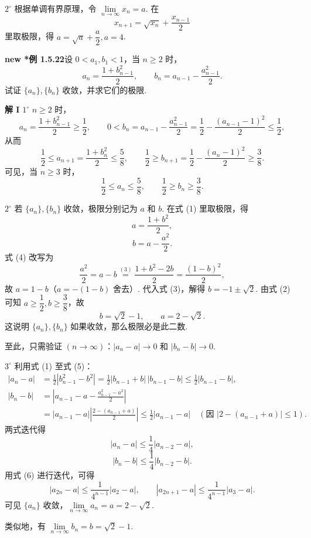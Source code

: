\documentclass[UTF8, 12pt, fontset=fandol, oneside]{ctexart}
\begin{document}
$2^\circ$ 根据单调有界原理，令 $\lim\limits_{n\to\infty}x_n=a$. 在
\[
  x_{n+1}=\sqrt{x_n}+\frac{x_{n-1}}2
\]
里取极限，得 $a=\sqrt a+\dfrac a2,a=4$.

\noindent\textbf{new *例 1.5.22}\quad 设 $0<a_1,b_1<1$，当 $n\ge 2$ 时，
\[
  a_n=\frac{1+b_{n-1}^2}{2},\qquad
  b_n=a_{n-1}-\frac{a_{n-1}^2}{2}.
\tag{1}
\]
试证 $\{a_n\},\{b_n\}$ 收敛，并求它们的极限.

\noindent\textbf{解 I}\quad
$1^\circ$ $n\ge 2$ 时，
\[
  a_n=\frac{1+b_{n-1}^2}{2}\ge \frac12,\qquad
  0<b_n=a_{n-1}-\frac{a_{n-1}^2}{2}
  =\frac12-\frac{(a_{n-1}-1)^2}{2}\le \frac12,
\]
从而
\[
  \frac12\le a_{n+1}=\frac{1+b_n^2}{2}\le \frac58,\qquad
  \frac12\ge b_{n+1}=\frac12-\frac{(a_n-1)^2}{2}\ge \frac38.
\]
可见，当 $n\ge 3$ 时，
\[
  \frac12\le a_n\le \frac58,\qquad \frac12\ge b_n\ge \frac38.
\tag{2}
\]

$2^\circ$ 若 $\{a_n\},\{b_n\}$ 收敛，极限分别记为 $a$ 和 $b$. 在式 (1) 里取极限，得
\[
  a=\frac{1+b^2}{2},
\tag{3}
\]
\[
  b=a-\frac{a^2}{2}.
\tag{4}
\]
式 (4) 改写为
\[
  \frac{a^2}{2}=a-b\stackrel{(3)}{=}
  \frac{1+b^2-2b}{2}
  =\frac{(1-b)^2}{2},
\]
故 $a=1-b$（$a=-(1-b)$ 舍去）. 代入式 (3)，解得 $b=-1\pm\sqrt2$. 由式 (2) 可知 $a\ge \dfrac12,b\ge \dfrac38$，故
\[
  b=\sqrt2-1,\qquad a=2-\sqrt2.
\tag{5}
\]
这说明 $\{a_n\},\{b_n\}$ 如果收敛，那么极限必是此二数.

至此，只需验证 $(n\to\infty)$：$|a_n-a|\to 0$ 和 $|b_n-b|\to 0$.

$3^\circ$ 利用式 (1) 至式 (5)：
\[
\begin{aligned}
  |a_n-a|
  &=\frac12|b_{n-1}^2-b^2|
   =\frac12|b_{n-1}+b|\,|b_{n-1}-b|
   \le \frac12|b_{n-1}-b|,\\
  |b_n-b|
  &=\left|a_{n-1}-a-\frac{a_{n-1}^2-a^2}{2}\right|\\
  &=|a_{n-1}-a|
    \left|\frac{2-(a_{n-1}+a)}2\right|
   \le \frac12|a_{n-1}-a|
  \quad (\text{因 }|2-(a_{n-1}+a)|\le 1).
\end{aligned}
\]
两式迭代得
\[
  |a_n-a|\le \frac14 |a_{n-2}-a|,
\tag{6}
\]
\[
  |b_n-b|\le \frac14 |b_{n-2}-b|.
\tag{7}
\]
用式 (6) 进行迭代，可得
\[
  |a_{2n}-a|\le \frac1{4^{n-1}}|a_2-a|,\qquad
  |a_{2n+1}-a|\le \frac1{4^{n-1}}|a_3-a|.
\]
可见 $\{a_n\}$ 收敛，$\lim\limits_{n\to\infty}a_n=a=2-\sqrt2$.

类似地，有 $\lim\limits_{n\to\infty}b_n=b=\sqrt2-1$.
\end{document}
